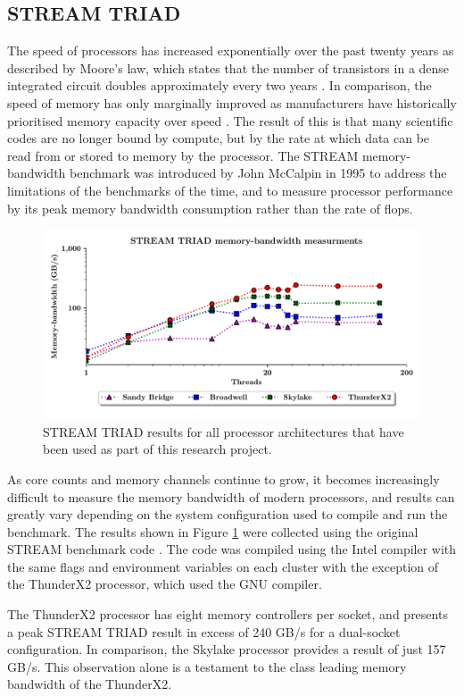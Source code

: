 \documentclass[a4paper,11pt]{report}
\begin{document}
\subsection{STREAM TRIAD}
The speed of processors has increased exponentially over the past twenty years as described by Moore's law, which states that the number of transistors in a dense integrated circuit doubles approximately every two years  \cite{moore1965cramming}. In comparison, the speed of memory has only marginally improved as manufacturers have historically prioritised memory capacity over speed \cite{mccalpin1995memory,patterson1997case}. The result of this is that many scientific codes are no longer bound by compute, but by the rate at which data can be read from or stored to memory by the processor. The STREAM memory-bandwidth benchmark was introduced by John McCalpin in 1995 to address the limitations of the benchmarks of the time, and to measure processor performance by its peak memory bandwidth consumption rather than the rate of \gls{flops}.
\begin{figure}[htbp]
\begin{center}
\includegraphics[width=1\textwidth]{img/stream-triad.pdf}
\caption[STREAM TRIAD benchmark]{STREAM TRIAD results for all processor architectures that have been used as part of this research project. }
\label{fig:bandwidth}
\end{center}
\end{figure}
\par 
As core counts and memory channels continue to grow, it becomes increasingly difficult to measure the memory bandwidth of modern processors, and results can greatly vary depending on the system configuration used to compile and run the benchmark. The results shown in Figure \ref{fig:bandwidth} were collected using the original STREAM benchmark code \cite{stream2019github}. The code was compiled using the Intel compiler with the same flags and environment variables on each cluster with the exception of the ThunderX2 processor, which used the GNU compiler. 
\par
The ThunderX2 processor has eight memory controllers per socket, and presents a peak STREAM TRIAD result in excess of 240 GB/s for a dual-socket configuration. In comparison, the Skylake processor provides a result of just 157 GB/s. This observation alone is a testament to the class leading memory bandwidth of the ThunderX2.
\end{document}
